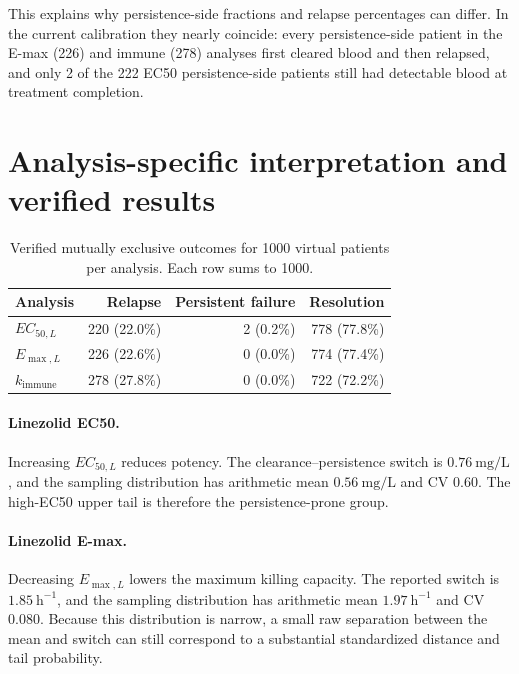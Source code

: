 \documentclass[11pt]{article}
\newcommand{\EC}{EC_{50,L}}
\newcommand{\EM}{E_{\max,L}}
\newcommand{\KI}{k_{\mathrm{immune}}}
\begin{document}
This explains why persistence-side fractions and relapse percentages can
differ. In the current calibration they nearly coincide: every persistence-side
patient in the E-max (226) and immune (278) analyses first cleared blood and then
relapsed, and only 2 of the 222 EC50 persistence-side patients still had detectable
blood at treatment completion.

\section{Analysis-specific interpretation and verified results}

\begin{table}[htbp]
\centering
\small
\begin{tabular}{@{}lrrr@{}}
\toprule
Analysis & Relapse & Persistent failure & Resolution \\
\midrule
$\EC$ & 220 (22.0\%) & 2 (0.2\%) & 778 (77.8\%) \\
$\EM$ & 226 (22.6\%) & 0 (0.0\%) & 774 (77.4\%) \\
$\KI$ & 278 (27.8\%) & 0 (0.0\%) & 722 (72.2\%) \\
\bottomrule
\end{tabular}
\caption{Verified mutually exclusive outcomes for 1000 virtual patients per
analysis. Each row sums to 1000.}
\label{tab:outcomes}
\end{table}

\paragraph{Linezolid EC50.}\mbox{}\par
Increasing $\EC$ reduces potency. The clearance--persistence switch is
$0.76~\mathrm{mg/L}$, and the sampling distribution has arithmetic mean
$0.56~\mathrm{mg/L}$ and CV 0.60. The high-EC50 upper tail is therefore the
persistence-prone group.

\paragraph{Linezolid E-max.}\mbox{}\par
Decreasing $\EM$ lowers the maximum killing capacity. The reported switch is
$1.85~\mathrm{h}^{-1}$, and the sampling distribution has arithmetic mean
$1.97~\mathrm{h}^{-1}$ and CV 0.080. Because this distribution is narrow, a
small raw separation between the mean and switch can still correspond to a
substantial standardized distance and tail probability.
\end{document}
